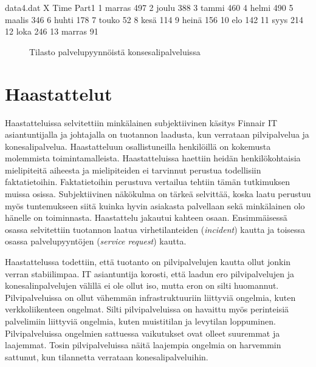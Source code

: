 \begin{filecontents}{data4.dat}
X Time  	Part1
1 marras  	497
2 joulu		388
3 tammi 	460
4 helmi		490
5 maalis	346
6 huhti		178
7 touko		52
8 kesä      114
9 heinä     156
10 elo      142
11 syys     214
12 loka     246
13 marras   91
\end{filecontents}

\begin{figure}[ht]
\caption{Tilasto palvelupyynnöistä konsesalipalveluissa}
\label{fig:konepyynto}
\end{figure}

\section{Haastattelut}
Haastatteluissa selvitettiin minkälainen subjektiivinen käsitys Finnair IT asiantuntijalla ja johtajalla on tuotannon laadusta, kun verrataan pilvipalvelua ja konesalipalvelua. Haastatteluun osallistuneilla henkilöillä on kokemusta molemmista toimintamalleista. Haastatteluissa haettiin heidän henkilökohtaisia mielipiteitä aiheesta ja mielipiteiden ei tarvinnut perustua todellisiin faktatietoihin. Faktatietoihin perustuva vertailua tehtiin tämän tutkimuksen muissa osissa. Subjektiivinen näkökulma on tärkeä selvittää, koska laatu perustuu myös tuntemukseen siitä kuinka hyvin asiakasta palvellaan sekä minkälainen olo hänelle on toiminnasta. Haastattelu jakautui kahteen osaan. Ensimmäisessä osassa selvitettiin tuotannon laatua virhetilanteiden (\emph{incident}) kautta ja toisessa osassa palvelupyyntöjen (\emph{service request}) kautta.

Haastattelussa todettiin, että tuotanto on pilvipalvelujen kautta ollut jonkin verran stabiilimpaa. IT asiantuntija korosti, että laadun ero pilvipalvelujen ja konesalinpalvelujen välillä ei ole ollut iso, mutta eron on silti huomannut. Pilvipalveluissa on ollut vähemmän infrastruktuuriin liittyviä ongelmia, kuten verkkoliikenteen ongelmat. Silti pilvipalveluissa on havaittu myös perinteisiä palvelimiin liittyviä ongelmia, kuten muistitilan ja levytilan loppuminen. Pilvipalveluissa ongelmien sattuessa vaikutukset ovat olleet suuremmat ja laajemmat. Tosin pilvipalveluissa näitä laajempia ongelmia on harvemmin sattunut, kun tilannetta verrataan konesalipalveluihin.

